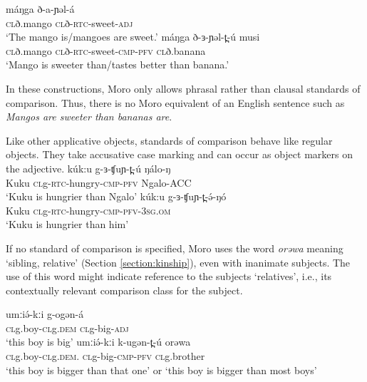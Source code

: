 \ea 
	\ea \gll máŋga 	ð-a-ɲəl-á	\\
			\textsc{cl}ð.mango 	\textsc{cl}ð-\textsc{rtc}-sweet-\textsc{adj}\\
		\glt ‘The mango is/mangoes are sweet.’
	\ex	\gll máŋga 	ð-ɜ-ɲəl-t̪-ú 			musi	\\
			\textsc{cl}ð.mango 	\textsc{cl}ð-\textsc{rtc}-sweet-\textsc{cmp}-\textsc{pfv}	\textsc{cl}ð.banana\\
		\glt	‘Mango is sweeter than/tastes better than banana.’
\z 	\z 

In these constructions, Moro only allows phrasal rather than clausal standards of comparison. Thus, there is no Moro equivalent of an English sentence such as \textit{Mangos are sweeter than bananas are}.

Like other applicative objects, standards of comparison behave like regular objects. They take accusative case marking and can occur as object markers on the adjective.
\ea
	\ea \gll 	kúk:u     		g-ɜ-ʧuɲ-t̪-ú                           ŋálo-ŋ\\
 Kuku  	\textsc{cl}g-\textsc{rtc}-hungry-\textsc{cmp}-\textsc{pfv}  	 Ngalo-ACC\\
		\glt  ‘Kuku is hungrier than Ngalo’
	\ex \gll kúk:u  	g-ɜ-ʧuɲ-t̪-ə́-ŋó             \\            	 	
			Kuku  	\textsc{cl}g-\textsc{rtc}-hungry-\textsc{cmp}-\textsc{pfv}-3\textsc{sg.om}  	 \\
		\glt	‘Kuku is hungrier than him’
	\z
\z 


If no standard of comparison is specified, Moro uses the word \textit{orəwa} meaning ‘sibling, relative’ (Section \ref{section:kinship}), even with inanimate subjects. The use of this word might indicate reference to the subjects `relatives', i.e., its contextually relevant comparison class for the subject.

\ea 
	\ea \gll umːiə́-kːi 		g-ogən-á\\
	\textsc{cl}g.boy-\textsc{cl}g.\textsc{dem}	\textsc{cl}g-big-\textsc{adj}	\\
		\glt ‘this boy is big’
	\ex \gll  umːiə́-kːi 		k-ugən-t̪-ú 			orəwa\\
			\textsc{cl}g.boy-\textsc{cl}g.\textsc{dem}.	\textsc{cl}g-big-\textsc{cmp}-\textsc{pfv}	\textsc{cl}g.brother\\
		\glt ‘this boy is bigger than that one’ or ‘this boy is bigger than most boys’
	\z \z 
	
